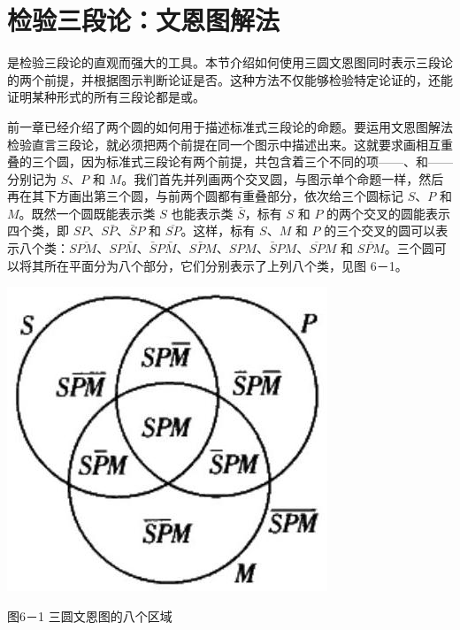 \section{检验三段论：文恩图解法}

\begin{logicbox}[title=引言]
是检验三段论的直观而强大的工具。本节介绍如何使用三圆文恩图同时表示三段论的两个前提，并根据图示判断论证是否。这种方法不仅能够检验特定论证的，还能证明某种形式的所有三段论都是或。
\end{logicbox}

\begin{theorembox}[title=三圆文恩图的构造]
前一章已经介绍了两个圆的如何用于描述标准式三段论的命题。要运用文恩图解法检验直言三段论，就必须把两个前提在同一个图示中描述出来。这就要求画相互重叠的三个圆，因为标准式三段论有两个前提，共包含着三个不同的项——、和——分别记为 $S$、$P$ 和 $M$。我们首先并列画两个交叉圆，与图示单个命题一样，然后再在其下方画出第三个圆，与前两个圆都有重叠部分，依次给三个圆标记 $S$、$P$ 和 $M$。既然一个圆既能表示类 $S$ 也能表示类 $\bar{S}$，标有 $S$ 和 $P$ 的两个交叉的圆能表示四个类，即 $SP$、$S\bar{P}$、$\bar{S}P$ 和 $\overline{SP}$。这样，标有 $S$、$M$ 和 $P$ 的三个交叉的圆可以表示八个类：$S\overline{PM}$、$SP\bar{M}$、$\bar{S}P\bar{M}$、$S\bar{P}M$、$SPM$、$\bar{S}PM$、$\overline{SP}M$ 和 $\overline{SPM}$。三个圆可以将其所在平面分为八个部分，它们分别表示了上列八个类，见图 6－1。
\end{theorembox}

\begin{center}
\includegraphics[width=\textwidth]{images/2025_05_15_6a28331d5e7c993ad07ag-274.jpg}

图6－1 三圆文恩图的八个区域
\end{center}

